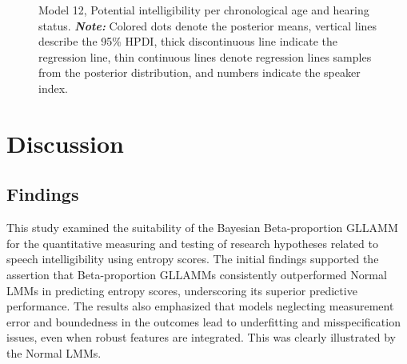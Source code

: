 \documentclass[
  authoryear,
  preprint,
  1p]{elsarticle}
\begin{document}
\label{cell-fig-rq3-intelligibility-model12}
\begin{figure}[H]


\caption{\label{fig-rq3-intelligibility-model12}Model 12, Potential
intelligibility per chronological age and hearing status.
\textbf{\emph{Note:}} Colored dots denote the posterior means, vertical
lines describe the 95\% HPDI, thick discontinuous line indicate the
regression line, thin continuous lines denote regression lines samples
from the posterior distribution, and numbers indicate the speaker
index.}

\end{figure}%

\section{Discussion}\label{sec-discussion}

\subsection{Findings}\label{sec-D-F}

This study examined the suitability of the Bayesian Beta-proportion
GLLAMM for the quantitative measuring and testing of research hypotheses
related to speech intelligibility using entropy scores. The initial
findings supported the assertion that Beta-proportion GLLAMMs
consistently outperformed Normal LMMs in predicting entropy scores,
underscoring its superior predictive performance. The results also
emphasized that models neglecting measurement error and boundedness in
the outcomes lead to underfitting and misspecification issues, even when
robust features are integrated. This was clearly illustrated by the
Normal LMMs.
\end{document}
